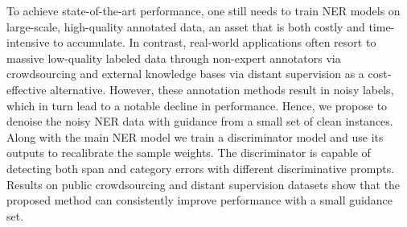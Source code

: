 To achieve state-of-the-art performance, one still needs to train NER models on large-scale, high-quality annotated data, an asset that is both costly and time-intensive to accumulate. In contrast, real-world applications often resort to massive low-quality labeled data through non-expert annotators via crowdsourcing and external knowledge bases via distant supervision as a cost-effective alternative. However, these annotation methods result in noisy labels, which in turn lead to a notable decline in performance. Hence, we propose to denoise the noisy NER data with guidance from a small set of clean instances.  Along with the main NER model we train a discriminator model and use its outputs to recalibrate the sample weights. The discriminator is capable of detecting both span and category errors with different discriminative prompts. Results on public crowdsourcing and distant supervision datasets show that the proposed method can consistently improve performance with a small guidance set.